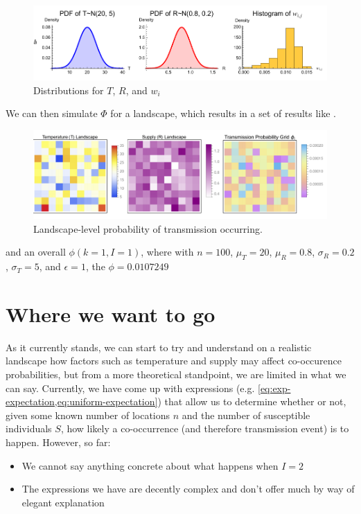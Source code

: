 \begin{figure}[!hpt]
    \centering
    \includegraphics[width=0.99\linewidth]{figs/si/R-T-pdfs-W-hist.pdf}
    \caption{Distributions for $T$, $R$, and $w_i$}
    \label{fig:t-s-wij-grid}
\end{figure}

We can then simulate $\Phi$ for a landscape, which results in a set of results like .

\begin{figure}[!hpt]
    \centering
    \includegraphics[width=0.8\linewidth]{figs/si/temp-supply-probability-landscape.pdf}
    \caption{Landscape-level probability of transmission occurring.}
    \label{fig:landscape-trans}
\end{figure}

and an overall $\phi(k=1, I=1)$, where with $n = 100$, $\mu_T = 20$, $\mu_R = 0.8$, $\sigma_R = 0.2$, $\sigma_T = 5$, and $\epsilon=1$, the $\phi = 0.0107249$

\section*{Where we want to go}

As it currently stands, we can start to try and understand on a realistic landscape how factors such as temperature and supply may affect co-occurence probabilities, but from a more theoretical standpoint, we are limited in what we can say. Currently, we have come up with expressions (e.g. \cref{eq:exp-expectation,eq:uniform-expectation}) that allow us to determine whether or not, given some known number of locations $n$ and the number of susceptible individuals $S$, how likely a co-occurrence (and therefore transmission event) is to happen. However, so far: 
\begin{itemize}
    \item We cannot say anything concrete about what happens when $I=2$
    \item The expressions we have are decently complex and don't offer much by way of elegant explanation 
\end{itemize}

